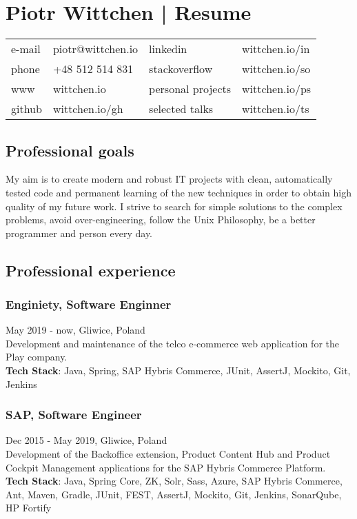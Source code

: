 \documentclass{article}
\begin{document}
  \section*{Piotr Wittchen | Resume}

  \begin{tabular}{llll}
    e-mail & piotr@wittchen.io & linkedin          & wittchen.io/in \\
    phone  & +48 512 514 831   & stackoverflow     & wittchen.io/so \\
    www    & wittchen.io       & personal projects & wittchen.io/ps \\
    github & wittchen.io/gh    & selected talks    & wittchen.io/ts \\
  \end{tabular}

    \subsection*{Professional goals}
    \small{My aim is to create modern and robust IT projects with clean,
    automatically tested code and permanent learning of the new techniques
    in order to obtain high quality of my future work.
    I strive to search for simple solutions to the complex problems,
    avoid over-engineering, follow the Unix Philosophy,
    be a better programmer and person every day.}

    \subsection*{Professional experience}

      \subsubsection*{Enginiety, Software Enginner}
      May 2019 - now, Gliwice, Poland\\[0.3em] 
      Development and maintenance of the telco e-commerce web application for the Play company.\\
      \textbf{Tech Stack}: Java, Spring, SAP Hybris Commerce, JUnit, AssertJ, Mockito, Git, Jenkins

      \subsubsection*{SAP, Software Engineer} 
      Dec 2015 - May 2019, Gliwice, Poland\\[0.3em]
      Development of the Backoffice extension, Product Content Hub 
      and Product Cockpit Management applications for the SAP Hybris Commerce Platform.\\
      \textbf{Tech Stack}: Java, Spring Core, ZK, Solr, Sass, Azure, 
      SAP Hybris Commerce, Ant, Maven, Gradle, JUnit, FEST, AssertJ, 
      Mockito, Git, Jenkins, SonarQube, HP Fortify
\end{document}
